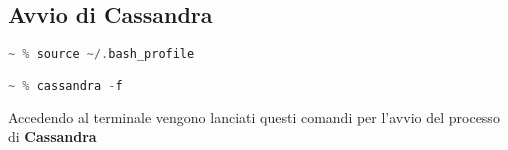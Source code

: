 \subsection{Avvio di Cassandra}
\begin{lstlisting}[language=C]
 ~ % source ~/.bash_profile

~ % cassandra -f 
\end{lstlisting}
Accedendo al terminale vengono lanciati questi comandi per l'avvio del processo di \textbf{Cassandra}